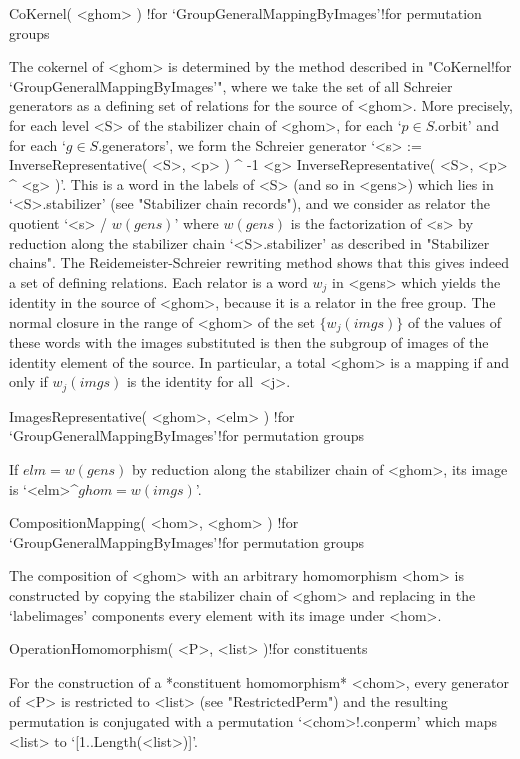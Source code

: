 \>CoKernel( <ghom> )%
  !{for `GroupGeneralMappingByImages'!for permutation groups}

The  cokernel  of   <ghom> is determined   by   the method   described in
"CoKernel!for `GroupGeneralMappingByImages'",  where  we take the  set of
all Schreier generators as a defining set of relations  for the source of
<ghom>. More  precisely, for each  level  <S> of the  stabilizer chain of
<ghom>, for each `$p\in S$.orbit'  and for each `$g\in S$.generators', we
form the  Schreier generator `<s>  := InverseRepresentative( <S>, <p> ) ^
-1 \* <g> \* InverseRepresentative( <S>, <p> ^ <g> )'. This  is a word in
the labels of <S> (and so in <gens>) which  lies in `<S>.stabilizer' (see
"Stabilizer chain records"), and we consider as relator the quotient `<s>
/ $w(gens)$' where $w(gens)$  is  the factorization  of <s> by  reduction
along the  stabilizer chain `<S>.stabilizer'  as described in "Stabilizer
chains". The Reidemeister-Schreier rewriting method shows that this gives
indeed a set  of  defining relations. Each  relator is  a word $w_j$   in
<gens> which yields the identity in the source of <ghom>, because it is a
relator in the free  group. The normal closure in  the range of <ghom> of
the set  $\{w_j(imgs)\}$ of  the  values of these  words  with the images
substituted is then the subgroup of images of the identity element of the
source.  In particular,  a  total  <ghom> is  a   mapping if  and only if
$w_j(imgs)$ is the identity for all~<j>.

\>ImagesRepresentative( <ghom>, <elm> )%
  !{for `GroupGeneralMappingByImages'!for permutation groups}

If $elm=w(gens)$  by reduction along  the stabilizer chain of <ghom>, its
image is `<elm>^$ghom=w(imgs)$'.

\>CompositionMapping( <hom>, <ghom> )%
  !{for `GroupGeneralMappingByImages'!for permutation groups}

The  composition  of  <ghom>  with   an arbitrary homomorphism   <hom> is
constructed  by copying the  stabilizer chain of  <ghom> and replacing in
the `labelimages' components every element with its image under <hom>.

\stars

\>OperationHomomorphism( <P>, <list> )!{for constituents}

For the   construction  of  a  *constituent  homomorphism* <chom>,  every
generator of  <P> is restricted to  <list> (see "RestrictedPerm") and the
resulting permutation  is conjugated with a permutation `<chom>!.conperm'
which maps <list> to `[1..Length(<list>)]'.

